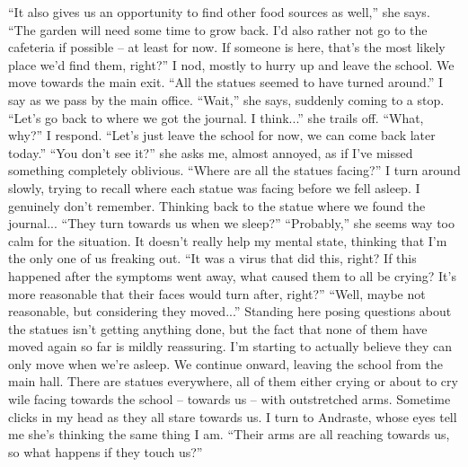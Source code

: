 \documentclass[a4paper, 12pt]{book}
\newcommand\tab[1][1cm]{\hspace*{#1}}
\begin{document}
\newline
\tab
``It also gives us an opportunity to find other food sources as well,'' she says. ``The garden will need some time to grow back. I’d also rather not go to the cafeteria if possible -- at least for now. If someone is here, that’s the most likely place we’d find them, right?'' I nod, mostly to hurry up and leave the school.
\newline
\tab
We move towards the main exit. ``All the statues seemed to have turned around.'' I say as we pass by the main office.
\newline
\tab
``Wait,'' she says, suddenly coming to a stop. ``Let’s go back to where we got the journal. I think...'' she trails off.
\newline
\tab
``What, why?'' I respond. ``Let’s just leave the school for now, we can come back later today.''
\newline
\tab
``You don’t see it?'' she asks me, almost annoyed, as if I’ve missed something completely oblivious. ``Where are all the statues facing?''
\newline
\tab
I turn around slowly, trying to recall where each statue was facing before we fell asleep. I genuinely don’t remember. Thinking back to the statue where we found the journal... ``They turn towards us when we sleep?''
\newline
\tab
``Probably,'' she seems way too calm for the situation. It doesn’t really help my mental state, thinking that I’m the only one of us freaking out.
\newline
\tab
``It was a virus that did this, right? If this happened after the symptoms went away, what caused them to all be crying? It’s more reasonable that their faces would turn after, right?''
\newline
\tab
``Well, maybe not reasonable, but considering they moved...'' Standing here posing questions about the statues isn’t getting anything done, but the fact that none of them have moved again so far is mildly reassuring. I’m starting to actually believe they can only move when we’re asleep.
\newline
\tab
We continue onward, leaving the school from the main hall. There are statues everywhere, all of them either crying or about to cry wile facing towards the school -- towards us -- with outstretched arms. Sometime clicks in my head as they all stare towards us. I turn to Andraste, whose eyes tell me she’s thinking the same thing I am. ``Their arms are all reaching towards us, so what happens if they touch us?''
\newline
\end{document}
